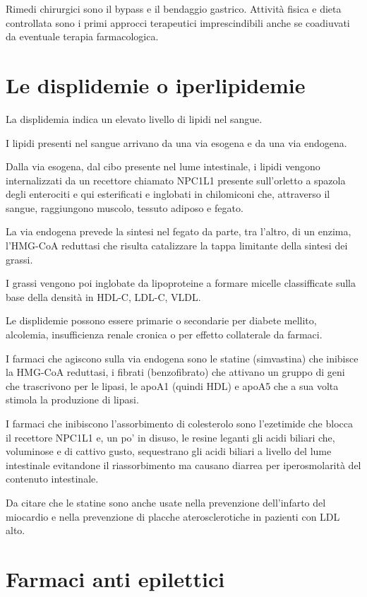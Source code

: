 Rimedi chirurgici sono il bypass e il bendaggio gastrico. Attività fisica e dieta controllata sono i primi approcci terapeutici imprescindibili anche se coadiuvati da eventuale terapia farmacologica.

\section{Le displidemie o iperlipidemie}

La displidemia indica un elevato livello di lipidi nel sangue. 

I lipidi presenti nel sangue arrivano da una via esogena e da una via endogena.

Dalla via esogena, dal cibo presente nel lume intestinale, i lipidi vengono internalizzati da un recettore chiamato NPC1L1 presente sull'orletto a spazola degli enterociti e qui esterificati e inglobati in chilomiconi che, attraverso il sangue, raggiungono muscolo, tessuto adiposo e fegato.

La via endogena prevede la sintesi nel fegato da parte, tra l'altro, di un enzima, l'HMG-CoA reduttasi che risulta catalizzare la tappa limitante della sintesi dei grassi.

I grassi vengono poi inglobate da lipoproteine a formare micelle classifficate sulla base della densità in HDL-C, LDL-C, VLDL.

Le displidemie possono essere primarie o secondarie per diabete mellito, alcolemia, insufficienza renale cronica o per effetto collaterale da farmaci.

I farmaci che agiscono sulla via endogena sono le statine (simvastina) che inibisce la HMG-CoA reduttasi, i fibrati (benzofibrato) che attivano un gruppo di geni che trascrivono per le lipasi, le apoA1 (quindi HDL) e apoA5 che a sua volta stimola la produzione di lipasi.

I farmaci che inibiscono l'assorbimento di colesterolo sono l'ezetimide che blocca il recettore NPC1L1 e, un po' in disuso, le resine leganti gli acidi biliari che, voluminose e di cattivo gusto, sequestrano gli acidi biliari a livello del lume intestinale evitandone il riassorbimento ma causano diarrea per iperosmolarità del contenuto intestinale.

Da citare che le statine sono anche usate nella prevenzione dell'infarto del miocardio e nella prevenzione di placche aterosclerotiche in pazienti con LDL alto.

\section{Farmaci anti epilettici}

